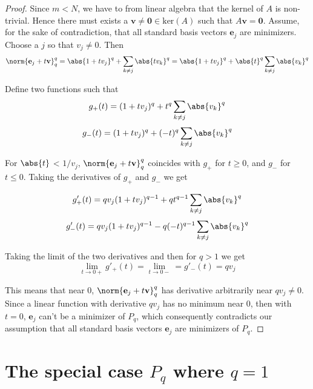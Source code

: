 \begin{proof}
Since $m < N$, we have to from linear algebra that the kernel of $A$ is non-trivial. Hence there must exists a $\mathbf{v} \neq{\mathbf{0}} \in \text{ker}(A)$ such that $A\mathbf{v}=\mathbf{0}$. Assume, for the sake of contradiction, that all standard basis vectors $\mathbf{e}_j$ are minimizers. Choose a $j$ so that $v_j \neq 0$. Then
\begin{equation*}
\norm{\mathbf{e}_j + t\mathbf{v}}_{q}^{q} = \abs{1 + tv_j}^q + \sum_{k \neq j } \abs{tv_k}^q = \abs{1 + tv_j}^q + \abs{t}^q\sum_{k \neq j } \abs{v_k}^q
\end{equation*}

Define two functions such that
\begin{equation*}
g_{+}(t) = (1 + tv_j)^q + t^q\sum_{k \neq j } \abs{v_k}^q
\end{equation*}
\begin{equation*}
g_{-}(t) = (1 + tv_j)^q + (-t)^q\sum_{k \neq j } \abs{v_k}^q
\end{equation*}

For $\abs{t}$ < $1/v_j$, $\norm{\mathbf{e}_j + t\mathbf{v}}_{q}^{q}$ coincides with $g_+$ for $t \geq 0$, and $g_-$ for $t \leq 0.$ Taking the derivatives of $g_+$ and $g_-$ we get

\begin{equation*}
g'_{+}(t) = qv_j(1 + tv_j)^{q-1} + qt^{q-1}\sum_{k \neq j } \abs{v_k}^q
\end{equation*}
\begin{equation*}
g'_{-}(t) = qv_j(1 + tv_j)^{q-1} - q(-t)^{q-1}\sum_{k \neq j } \abs{v_k}^q
\end{equation*}

Taking the limit of the two derivatives and then for $q > 1$ we get
\begin{equation*}
\lim_{t \rightarrow 0+} g'_{+}(t) = \lim_{t \rightarrow 0-} = g'_{-}(t) = qv_j
\end{equation*}

This means that near 0, $\norm{\mathbf{e}_j + t\mathbf{v}}_{q}^{q}$ has derivative arbitrarily near $qv_j \neq 0$. Since a linear function with derivative $qv_j$ has no minimum near 0, then with $t = 0$, $\mathbf{e}_j$ can't be a minimizer of $P_q$, which consequently contradicts our assumption that all standard basis vectors $\mathbf{e}_j$ are minimizers of $P_q$.


\end{proof}


\section*{The special case $P_q$ where $q = 1$}

